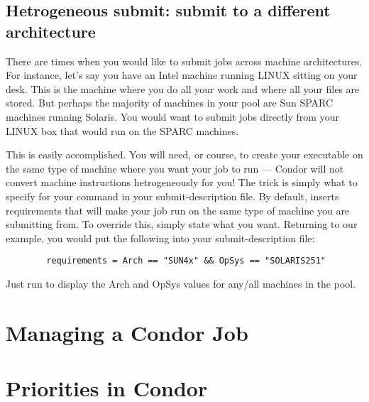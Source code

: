 \subsection{Hetrogeneous submit: submit to a different architecture} 

There are times when you would like to submit jobs across machine
architectures. For instance, let's say you have an Intel machine running
LINUX sitting on your desk. This is the machine where you do all your
work and where all your files are stored. But perhaps the majority of
machines in your pool are Sun SPARC machines running Solaris. You would
want to submit jobs directly from your LINUX box that would run on the
SPARC machines.

This is easily accomplished.  You will need, or course, to create your
executable on the same type of machine where you want your job to run ---
Condor will not convert machine instructions hetrogeneously for you! The
trick is simply what to specify for your  command in
your submit-description file.  By default,  inserts
requirements that will make your job run on the same type of machine you
are submitting from.  To override this, simply state what you want.
Returning to our example, you would put the following into your
submit-description file:
\begin{verbatim}
        requirements = Arch == "SUN4x" && OpSys == "SOLARIS251"
\end{verbatim}
Just run  to display the Arch and OpSys values for any/all 
machines in the pool.




\section{Managing a Condor Job}


\section{Priorities in Condor}

